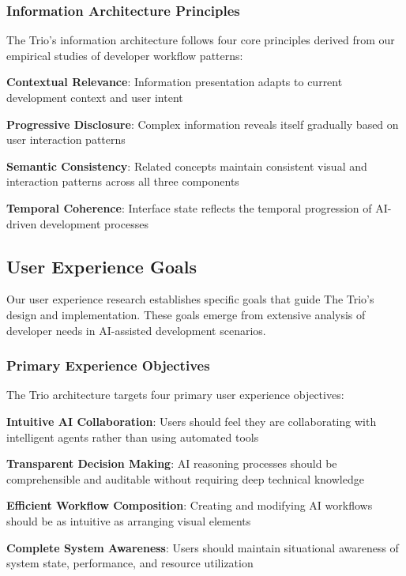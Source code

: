\subsubsection*{Information Architecture Principles}

The Trio's information architecture follows four core principles derived from our empirical studies of developer workflow patterns:

\begin{compactlist}
    \item \textbf{Contextual Relevance}: Information presentation adapts to current development context and user intent
    \item \textbf{Progressive Disclosure}: Complex information reveals itself gradually based on user interaction patterns
    \item \textbf{Semantic Consistency}: Related concepts maintain consistent visual and interaction patterns across all three components
    \item \textbf{Temporal Coherence}: Interface state reflects the temporal progression of AI-driven development processes
\end{compactlist}

\subsection*{User Experience Goals}

Our user experience research establishes specific goals that guide The Trio's design and implementation. These goals emerge from extensive analysis of developer needs in AI-assisted development scenarios.

\subsubsection*{Primary Experience Objectives}

The Trio architecture targets four primary user experience objectives:

\begin{expandedlist}
    \item \textbf{Intuitive AI Collaboration}: Users should feel they are collaborating with intelligent agents rather than using automated tools
    \item \textbf{Transparent Decision Making}: AI reasoning processes should be comprehensible and auditable without requiring deep technical knowledge
    \item \textbf{Efficient Workflow Composition}: Creating and modifying AI workflows should be as intuitive as arranging visual elements
    \item \textbf{Complete System Awareness}: Users should maintain situational awareness of system state, performance, and resource utilization
\end{expandedlist}

